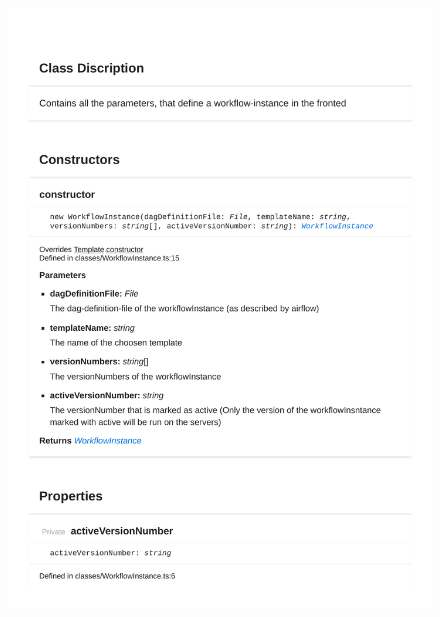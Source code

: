 \begin{figure}[H]
\centerline{\includegraphics[width=\textwidth]{FrontendDocsAsPDF/Classes/WorkflowInstance.pdf}}
\end{figure}
